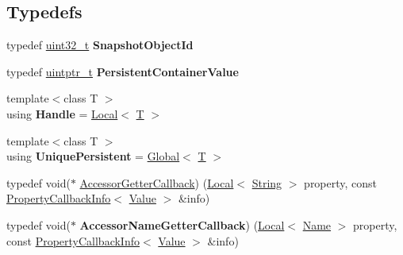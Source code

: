 \subsection*{Typedefs}
\begin{DoxyCompactItemize}
\item 
\mbox{\label{namespacev8_acc05be0fdcf26b26fbb410e75a048e63}} 
typedef \mbox{\hyperlink{classuint32__t}{uint32\+\_\+t}} {\bfseries Snapshot\+Object\+Id}
\item 
\mbox{\label{namespacev8_af40bc0395e06dd22c3bb1328deb94869}} 
typedef \mbox{\hyperlink{classuintptr__t}{uintptr\+\_\+t}} {\bfseries Persistent\+Container\+Value}
\item 
\mbox{\label{namespacev8_a9b42f6a6adfdc70e92717a20a2e99ba3}} 
{\footnotesize template$<$class T $>$ }\\using {\bfseries Handle} = \mbox{\hyperlink{classv8_1_1Local}{Local}}$<$ \mbox{\hyperlink{classv8_1_1internal_1_1torque_1_1T}{T}} $>$
\item 
\mbox{\label{namespacev8_a700d7673ecc33741d51e3d22907e8e3f}} 
{\footnotesize template$<$class T $>$ }\\using {\bfseries Unique\+Persistent} = \mbox{\hyperlink{classv8_1_1Global}{Global}}$<$ \mbox{\hyperlink{classv8_1_1internal_1_1torque_1_1T}{T}} $>$
\item 
typedef void($\ast$ \mbox{\hyperlink{namespacev8_a722613c87061708a4f1aa050d095f868}{Accessor\+Getter\+Callback}}) (\mbox{\hyperlink{classv8_1_1Local}{Local}}$<$ \mbox{\hyperlink{classv8_1_1String}{String}} $>$ property, const \mbox{\hyperlink{classv8_1_1PropertyCallbackInfo}{Property\+Callback\+Info}}$<$ \mbox{\hyperlink{classv8_1_1Value}{Value}} $>$ \&info)
\item 
\mbox{\label{namespacev8_a933dad4c36666875af1843bb98df8379}} 
typedef void($\ast$ {\bfseries Accessor\+Name\+Getter\+Callback}) (\mbox{\hyperlink{classv8_1_1Local}{Local}}$<$ \mbox{\hyperlink{classv8_1_1Name}{Name}} $>$ property, const \mbox{\hyperlink{classv8_1_1PropertyCallbackInfo}{Property\+Callback\+Info}}$<$ \mbox{\hyperlink{classv8_1_1Value}{Value}} $>$ \&info)
\item 
\mbox{\label{namespacev8_a926da9728efe528d193a6d36f004777e}} 

\end{DoxyCompactItemize}
